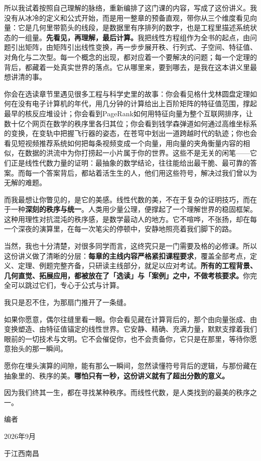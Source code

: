 \documentclass[a4paper,12pt,twoside,openany,fontset=none]{ctexbook}
\numberwithin{equation}{chapter}
\begin{document}
所以我试着按照自己理解的脉络，重新编排了这门课的内容，写成了这份讲义。我没有从冰冷的定义和公式开始，而是用一整章的预备直观，带你从三个维度看见向量：它是几何里带箭头的线段，是数据里有序排列的数字，也是工程里描述系统状态的一组量。\textbf{先看见，再理解，最后计算。}我把线性方程组作为全书的起点，由问题引出矩阵，由矩阵引出线性变换，再一步步展开秩、行列式、子空间、特征值、对角化与二次型。每一个概念的出现，都对应着一个要解决的问题；每一个定理的背后，都藏着一处真实世界的落点。它从哪里来，要到哪去，是我在这本讲义里最想讲清的事。

你会在选读章节里遇见很多工程与科学史里的故事：你会看见格什戈林圆盘定理如何在没有电子计算机的年代，用几分钟的计算给出上百阶矩阵的特征值范围，撑起最早的核反应堆设计；你会看到PageRank如何用特征向量为整个互联网排序，让数十亿个网页在数学的秩序里各归其位；你会看到钱学森弹道如何通过高维坐标系的变换，在变轨中把握飞行器的姿态，在苍穹中划出一道跨越时代的轨迹；你也会看见短视频推荐系统如何把每条视频变成一个向量，用向量的夹角衡量内容的相似，在数据的洪流中为你打捞起一小片属于你的世界。这些不是无关的闲笔——它们正是线性代数力量的证明：最抽象的数学结论，往往能给出最干脆、最可靠的答案。而每一个答案背后，都站着活生生的人，他们用这些符号，解决过我们曾以为无解的难题。

而我最想让你瞥见的，是它的美感。线性代数的美，不在于复杂的证明技巧，而在于一种\textbf{深刻的秩序与统一}。人类用少量公理，便撑起了一个理解世界的稳固框架。这种用理性对抗混沌的秩序感，是数学最动人的地方。它不喧哗，不张扬，却在每一个深夜的演算里，在每一次笔尖的停顿中，安静地照亮着我们脚下的路。

当然，我也十分清楚，对很多同学而言，这终究只是一门需要及格的必修课。所以这份讲义做了清晰的分层：\textbf{每章的主线内容严格紧扣课程要求}，覆盖全部考点，定义、定理、例题完整齐备，只研读主线部分，就足以应对考试。\textbf{所有的工程背景、几何直觉、拓展应用，都被放在了「选读」与「案例」之中，不做考核要求。}你完全可以跳过它们，专心于公式与计算。

我只是忍不住，为那扇门推开了一条缝。

如果你愿意，偶尔往缝里看一眼。你会看见藏在计算背后的，那个由向量张成、由变换塑造、由特征值锚定的线性世界。它安静、精确、充满力量，默默支撑着我们眼前的一切技术与文明。它不会催促你，也不会责备你，它只是在那里，等待你愿意抬头的那一瞬间。

愿你在埋头演算的间隙，能有那么一瞬间，忽然读懂符号背后的逻辑，与那份藏在抽象里的、秩序的美。\textbf{哪怕只有一秒，这份讲义就有了超出分数的意义。}

因为我们终其一生，都在寻找某种秩序。而线性代数，是人类找到的最美的秩序之一。
\par\vspace{1.2cm}
\noindent\hfill
\begin{minipage}{5.3cm}
    \raggedleft
    编者\par
    2026年9月\par
    于江西南昌
\end{minipage}
\par\clearpage
\endgroup
\end{document}
